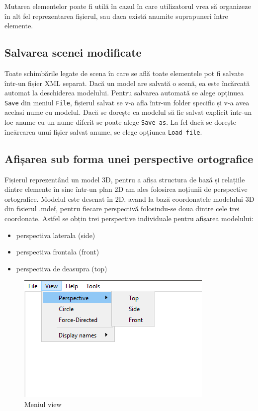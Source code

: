 Mutarea elementelor poate fi utilă în cazul în care utilizatorul vrea să organizeze în alt fel reprezentarea fișierul, sau daca există
anumite suprapuneri între elemente.\newline 

\subsection{Salvarea scenei modificate}
Toate schimbările legate de scena în care se află toate elementele pot fi salvate într-un fișier XML separat. 
Dacă un model are salvată o scenă, ea este încărcată automat la deschiderea modelului.
Pentru salvarea automată se alege opținuea \verb|Save| din meniul \verb|File|, fișierul salvat se v-a afla într-un folder specific și v-a avea acelasi nume cu modelul.
Dacă se dorește ca modelul să fie salvat explicit într-un loc anume cu un nume diferit se poate alege \verb|Save as|. La fel dacă se dorește 
încărcarea unui fișier salvat anume, se elege opțiunea \verb|Load file|.

\subsection{Afișarea sub forma unei perspective ortografice}
Fișierul reprezentând un model 3D, pentru a afișa structura de bază și relațiile dintre elemente în sine într-un plan 2D am 
ales folosirea noțiunii de perspective ortografice. Modelul este desenat în 2D, avand la bază coordonatele modelului
3D din fisierul .mdef, pentru fiecare perspectivă folosindu-se doua dintre cele trei coordonate.
Astfel se obțin trei perspective individuale pentru afișarea modelului:

\begin{itemize}
    \item perspectiva laterala (side)
    \item perspectiva frontala (front)
    \item perspectiva de deasupra (top)
\end{itemize} 


\begin{figure}[H]
    \begin{center}
    \includegraphics[scale=0.7]{imagini/implementare/viewmenu.png}
    \end{center}
    \caption{Meniul view}
    \label{fig:tabs}
\end{figure}

